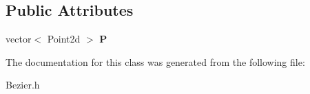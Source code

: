 \subsection*{Public Attributes}
\begin{DoxyCompactItemize}
\item 
\mbox{\label{class_bezier_a8e1b92ea9e2841e318099daf153e84ca}} 
vector$<$ Point2d $>$ {\bfseries P}
\end{DoxyCompactItemize}


The documentation for this class was generated from the following file\+:\begin{DoxyCompactItemize}
\item 
Bezier.\+h\end{DoxyCompactItemize}
